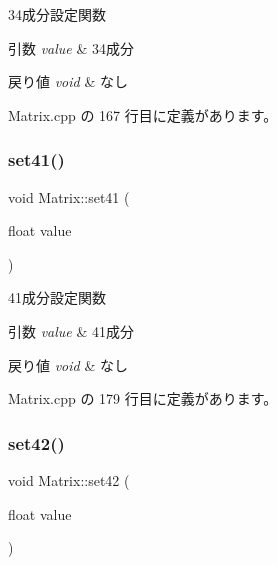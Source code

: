 34成分設定関数 


\begin{DoxyParams}{引数}
{\em value} & 34成分 \\
\hline
\end{DoxyParams}

\begin{DoxyRetVals}{戻り値}
{\em void} & なし \\
\hline
\end{DoxyRetVals}


 Matrix.\+cpp の 167 行目に定義があります。

\mbox{\label{class_matrix_ae649f42548ca5617d8d1d47252a786f2}} 
\subsubsection{\texorpdfstring{set41()}{set41()}}
{\footnotesize\ttfamily void Matrix\+::set41 (\begin{DoxyParamCaption}\item[{float}]{value }\end{DoxyParamCaption})}



41成分設定関数 


\begin{DoxyParams}{引数}
{\em value} & 41成分 \\
\hline
\end{DoxyParams}

\begin{DoxyRetVals}{戻り値}
{\em void} & なし \\
\hline
\end{DoxyRetVals}


 Matrix.\+cpp の 179 行目に定義があります。

\mbox{\label{class_matrix_a397c7b3f9292c224f86cdf0cb4d8e46d}} 
\subsubsection{\texorpdfstring{set42()}{set42()}}
{\footnotesize\ttfamily void Matrix\+::set42 (\begin{DoxyParamCaption}\item[{float}]{value }\end{DoxyParamCaption})}



